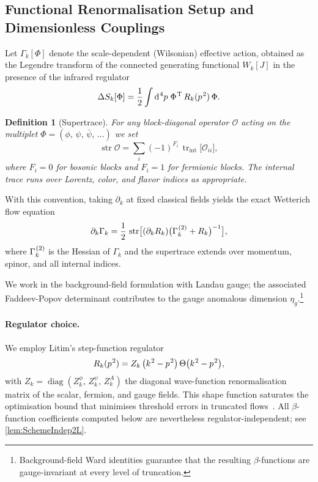 \documentclass[pdflatex,sn-mathphys-num]{sn-jnl}
\theoremstyle{thmstyleone}
\theoremstyle{thmstyletwo}%
\theoremstyle{thmstylethree}%
\newtheorem{definition}{Definition}%
\newcommand{\str}{\operatorname{str}}
\newcommand{\sm}{\hspace{.065em}}
\newcommand{\smexp}[1]{^{\sm #1}}
\newcommand{\diag}{\operatorname{diag}}
\begin{document}
\subsection{Functional Renormalisation Setup and Dimensionless Couplings}
\label{subsec:FRGsetup}
Let $\Gamma_{k}[\Phi]$ denote the scale-dependent (Wilsonian) effective
action, obtained as the Legendre transform of the connected generating
functional $W_{k}[J]$ in the presence of the infrared regulator
\[
  \Delta S_{k}[\Phi]
  =\frac12
   \int {\rm d}\smexp{4}p\;
   \Phi\smexp{\mathrm T}\,R_{k}(p\smexp{2})\,\Phi.
\]

\begin{definition}[Supertrace]\label{def:STr}
For any block-diagonal operator $\mathcal O$ acting on the multiplet
$\Phi=(\phi,\,\psi,\,\bar\psi,\,\dots)$ we set
\[
  \str\mathcal O
  =\sum_{i}(-1)^{F_{i}}\,
        \operatorname{tr}_{\text{int}}\bigl[\mathcal O_{ii}\bigr],
\]
where $F_{i}=0$ for bosonic blocks and $F_{i}=1$ for fermionic blocks.
The internal trace runs over Lorentz, color, and flavor indices as
appropriate.
\end{definition}

With this convention, taking $\partial_{k}$ at fixed classical fields
yields the exact Wetterich flow equation~\cite{Wetterich:1993}
\begin{equation}
  \partial_{k}\Gamma_{k}
  =\frac12\,
    \str\bigl[
      (\partial_{k}R_{k})
      \bigl(\Gamma_{k}\smexp{(2)}+R_{k}\bigr)^{-1}
    \bigr],
  \label{eq:Wetterich}
\end{equation}
where $\Gamma_{k}\smexp{(2)}$ is the Hessian of $\Gamma_{k}$ and the
supertrace extends over momentum, spinor, and all internal indices.

We work in the background-field formulation with Landau gauge; the
associated Faddeev-Popov determinant contributes to the gauge anomalous
dimension $\eta_{g}$.\footnote{Background-field Ward identities guarantee
that the resulting $\beta$-functions are gauge-invariant at every level
of truncation.}

\paragraph{Regulator choice.}
We employ Litim's step-function regulator
\begin{equation}
  R_{k}(p\smexp{2})
  =Z_{k}\,
   \bigl(k\smexp{2}-p\smexp{2}\bigr)\,
   \Theta\bigl(k\smexp{2}-p\smexp{2}\bigr),
  \label{eq:LitimReg}
\end{equation}
with $Z_{k}=\diag(Z_{k}^{\phi},\,Z_{k}^{\psi},\,Z_{k}^{A})$ the diagonal
wave-function renormalisation matrix of the scalar, fermion, and gauge
fields.  This shape function saturates the optimisation bound that
minimises threshold errors in truncated flows~\cite{Litim:2001fd}. All
$\beta$-function coefficients computed below are nevertheless
regulator-independent; see \autoref{lem:SchemeIndep2L}.
\end{document}
